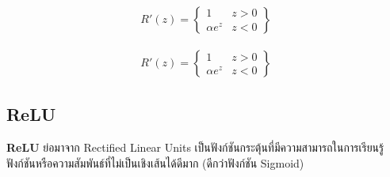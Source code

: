 \begin{figure}[H]
\begin{subfigure}{0.5\textwidth}
      \caption{%
          \begin{equation}
              \begin{split}R'(z) =
                  \begin{Bmatrix}
                      1          & z>0 \\
                      \alpha e^z & z<0
                  \end{Bmatrix}
              \end{split}
          \end{equation}
      }
      \label{fig:actfunc_elu_der}
  \end{subfigure}
\end{figure}

\subsection{ReLU}

\textbf{ReLU}\autocite{glorot2011} ย่อมาจาก Rectified Linear Units เป็นฟังก์ชันกระตุ้นที่มีความสามารถในการเรียนรู้ฟังก์ชันหรือความสัมพันธ์ที่ไม่เป็นเชิงเส้นได้ดีมาก (ดีกว่าฟังก์ชัน Sigmoid)

